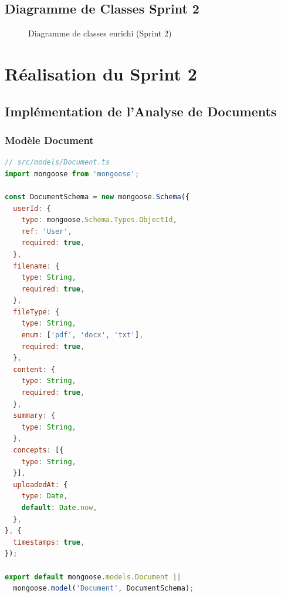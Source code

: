 \subsection{Diagramme de Classes Sprint 2}

\begin{figure}[H]
    \centering
    \caption{Diagramme de classes enrichi (Sprint 2)}
    \label{fig:classes-sprint2}
\end{figure}

\section{Réalisation du Sprint 2}

\subsection{Implémentation de l'Analyse de Documents}

\subsubsection{Modèle Document}

\begin{lstlisting}[language=JavaScript, caption=Schéma Mongoose Document, label=code:document-schema]
// src/models/Document.ts
import mongoose from 'mongoose';

const DocumentSchema = new mongoose.Schema({
  userId: {
    type: mongoose.Schema.Types.ObjectId,
    ref: 'User',
    required: true,
  },
  filename: {
    type: String,
    required: true,
  },
  fileType: {
    type: String,
    enum: ['pdf', 'docx', 'txt'],
    required: true,
  },
  content: {
    type: String,
    required: true,
  },
  summary: {
    type: String,
  },
  concepts: [{
    type: String,
  }],
  uploadedAt: {
    type: Date,
    default: Date.now,
  },
}, {
  timestamps: true,
});

export default mongoose.models.Document || 
  mongoose.model('Document', DocumentSchema);
\end{lstlisting}


